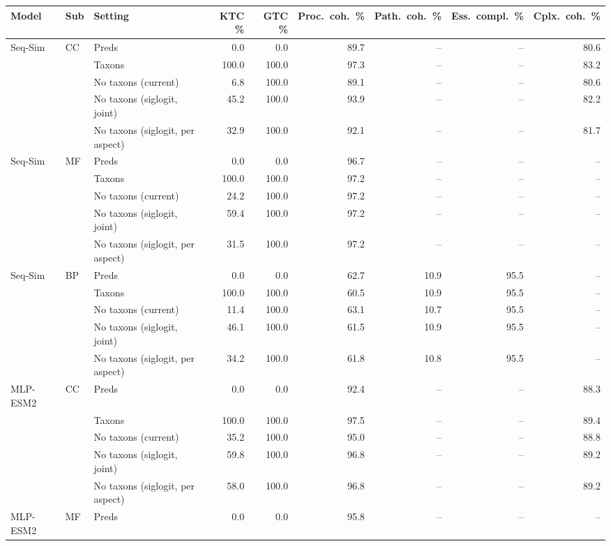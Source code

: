 \begin{tabular}{lllrrrrrr}
\toprule
Model & Sub & Setting & KTC \% & GTC \% & Proc.\ coh.\ \% & Path.\ coh.\ \% & Ess.\ compl.\ \% & Cplx.\ coh.\ \% \\
\midrule
Seq-Sim & CC & Preds & 0.0 & 0.0 & 89.7 & -- & -- & 80.6 \\
 &  & Taxons & 100.0 & 100.0 & 97.3 & -- & -- & 83.2 \\
 &  & No taxons (current) & 6.8 & 100.0 & 89.1 & -- & -- & 80.6 \\
 &  & No taxons (siglogit, joint) & 45.2 & 100.0 & 93.9 & -- & -- & 82.2 \\
 &  & No taxons (siglogit, per aspect) & 32.9 & 100.0 & 92.1 & -- & -- & 81.7 \\
\addlinespace
Seq-Sim & MF & Preds & 0.0 & 0.0 & 96.7 & -- & -- & -- \\
 &  & Taxons & 100.0 & 100.0 & 97.2 & -- & -- & -- \\
 &  & No taxons (current) & 24.2 & 100.0 & 97.2 & -- & -- & -- \\
 &  & No taxons (siglogit, joint) & 59.4 & 100.0 & 97.2 & -- & -- & -- \\
 &  & No taxons (siglogit, per aspect) & 31.5 & 100.0 & 97.2 & -- & -- & -- \\
\addlinespace
Seq-Sim & BP & Preds & 0.0 & 0.0 & 62.7 & 10.9 & 95.5 & -- \\
 &  & Taxons & 100.0 & 100.0 & 60.5 & 10.9 & 95.5 & -- \\
 &  & No taxons (current) & 11.4 & 100.0 & 63.1 & 10.7 & 95.5 & -- \\
 &  & No taxons (siglogit, joint) & 46.1 & 100.0 & 61.5 & 10.9 & 95.5 & -- \\
 &  & No taxons (siglogit, per aspect) & 34.2 & 100.0 & 61.8 & 10.8 & 95.5 & -- \\
\midrule
MLP-ESM2 & CC & Preds & 0.0 & 0.0 & 92.4 & -- & -- & 88.3 \\
 &  & Taxons & 100.0 & 100.0 & 97.5 & -- & -- & 89.4 \\
 &  & No taxons (current) & 35.2 & 100.0 & 95.0 & -- & -- & 88.8 \\
 &  & No taxons (siglogit, joint) & 59.8 & 100.0 & 96.8 & -- & -- & 89.2 \\
 &  & No taxons (siglogit, per aspect) & 58.0 & 100.0 & 96.8 & -- & -- & 89.2 \\
\addlinespace
MLP-ESM2 & MF & Preds & 0.0 & 0.0 & 95.8 & -- & -- & -- \\

\end{tabular}
